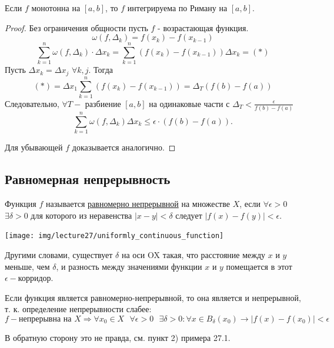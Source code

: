     \begin{corollary}
    	Если $f$ монотонна на $[a, b]$, то $f$ интегрируема по Риману на $[a, b]$.
    \end{corollary}
    
    \begin{proof}
    	Без ограничения общности пусть $f$ - возрастающая функция.
    	\[ \omega(f, \Delta_k) = f(x_k) - f(x_{k - 1}) \]
    	\[ \sum_{k = 1}^n \omega(f, \Delta_k) \cdot \Delta x_k = \sum_{k = 1}^n (f(x_k) - f(x_{k - 1})) \Delta x_k = (*) \]
    	Пусть $\Delta x_k = \Delta x_j$ $\forall k, j$. Тогда
    	\[ (*) = \Delta x_1 \sum_{k = 1}^n (f(x_k) - f(x_{k - 1})) = \Delta_T (f(b) - f(a)) \]
    	Следовательно, $\forall T -$ разбиение $[a, b]$ на одинаковые части с $\Delta_T < \frac{\epsilon}{f(b) - f(a)}$
    	\[ \sum_{k = 1}^n \omega(f, \Delta_k) \Delta x_k \leqslant \epsilon \cdot (f(b) - f(a)). \]
    	
        Для убывающей $f$ доказывается аналогично.
    \end{proof}
    
    \subsection{Равномерная непрерывность}
    
    \begin{definition}
    	\item Функция $f$ называется \underline{равномерно непрерывной} на
    	множестве $X$, если $\forall \epsilon > 0$ $\exists \delta > 0$ для которого из неравенства
    	$|x - y| < \delta$ следует $|f(x) - f(y)| < \epsilon.$
    \end{definition}
    
    \begin{center}
    	\texttt{[image: img/leсture27/uniformly\_continuous\_function]}
    \end{center}
    
    \begin{explanation}
    	Другими словами, существует $\delta$ на оси OX такая, что расстояние между $x$ и $y$ меньше, чем $\delta$, и разность между значениями функции $x$ и $y$ помещается в этот $\epsilon-$корридор.
    \end{explanation}
    
    \begin{mention}
    	Если функция является равномерно-непрерывной, то она является и непрерывной, т. к. определение непрерывности слабее:
    	\[ f - \text{непрерывна на } X \Rightarrow \forall x_0 \in X \text{ } \forall \epsilon > 0 \text{ } \exists \delta > 0: \forall x \in B_{\delta}(x_0) \rightarrow |f(x) - f(x_0)| < \epsilon \]
    	
    	В обратную сторону это не правда, см. пункт 2) примера 27.1.
    \end{mention}
    
